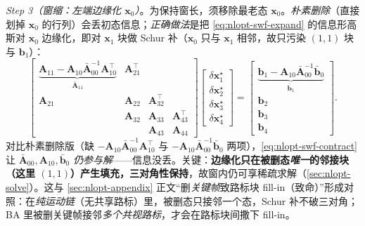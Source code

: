 \begin{derivation}
\emph{Step 3（窗缩：左端边缘化 $\mathbf{x}_0$）}。为保持窗长，须移除最老态 $\mathbf{x}_0$。\emph{朴素删除}（直接划掉 $\mathbf{x}_0$ 的行列）会丢初态信息；\emph{正确做法}是把 \cref{eq:nlopt-swf-expand} 的信息形高斯对 $\mathbf{x}_0$ 边缘化，即对 $\mathbf{x}_1$ 块做 Schur 补（$\mathbf{x}_0$ 只与 $\mathbf{x}_1$ 相邻，故只污染 $(1,1)$ 块与 $\mathbf{b}_1$）：
\begin{equation}
\begin{bmatrix}
\underbrace{\mathbf{A}_{11}-\mathbf{A}_{10}\bar{\mathbf{A}}_{00}^{-1}\mathbf{A}_{10}^\top}_{\textstyle\bar{\mathbf{A}}_{11}} & \mathbf{A}_{21}^\top & & \\
\mathbf{A}_{21} & \mathbf{A}_{22} & \mathbf{A}_{32}^\top & \\
 & \mathbf{A}_{32} & \mathbf{A}_{33} & \mathbf{A}_{43}^\top \\
 & & \mathbf{A}_{43} & \mathbf{A}_{44}
\end{bmatrix}
\begin{bmatrix}\delta\mathbf{x}_1^\star\\ \delta\mathbf{x}_2^\star\\ \delta\mathbf{x}_3^\star\\ \delta\mathbf{x}_4^\star\end{bmatrix}
=\begin{bmatrix}\underbrace{\mathbf{b}_1-\mathbf{A}_{10}\bar{\mathbf{A}}_{00}^{-1}\bar{\mathbf{b}}_0}_{\textstyle\bar{\mathbf{b}}_1}\\ \mathbf{b}_2\\ \mathbf{b}_3\\ \mathbf{b}_4\end{bmatrix}.
\label{eq:nlopt-swf-contract}
\end{equation}
对比朴素删除版（缺 $-\mathbf{A}_{10}\bar{\mathbf{A}}_{00}^{-1}\mathbf{A}_{10}^\top$ 与 $-\mathbf{A}_{10}\bar{\mathbf{A}}_{00}^{-1}\bar{\mathbf{b}}_0$ 两项），\cref{eq:nlopt-swf-contract} 让 $\bar{\mathbf{A}}_{00},\mathbf{A}_{10},\bar{\mathbf{b}}_0$ \emph{仍参与解}——信息没丢。关键：\textbf{边缘化只在被删态\emph{唯一}的邻接块（这里 $(1,1)$）产生填充，三对角性保持}，故窗内仍可享稀疏求解（\cref{sec:nlopt-solve}）。这与 \cref{sec:nlopt-appendix} 正文“删\emph{关键帧}致路标块 fill-in（致命）”形成对照：在\emph{纯运动链}（无共享路标）里，被删态只接邻一个态，Schur 补不破三对角；BA 里被删关键帧接邻\emph{多个共视路标}，才会在路标块间撒下 fill-in。


\end{derivation}
